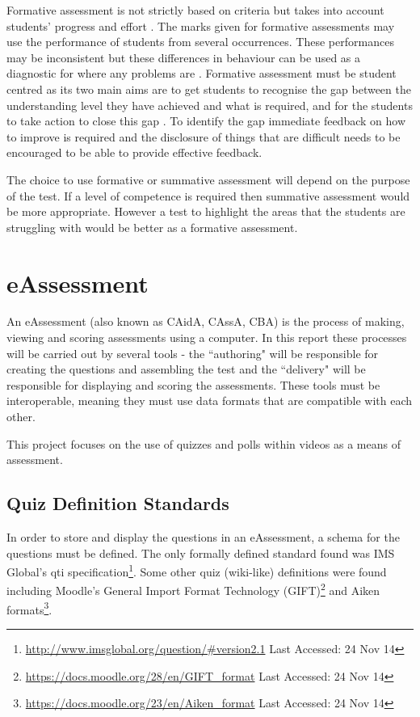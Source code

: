 Formative assessment is not strictly based on criteria but takes into account students' progress and effort \citep{assessmentTypes}. The marks given for formative assessments may use the performance of students from several occurrences. These performances may be inconsistent but these differences in behaviour can be used as a diagnostic for where any problems are \citep{assessmentTypes}. Formative assessment must be student centred as its two main aims are to get students to recognise the gap between the understanding level they have achieved and what is required, and for the students to take action to close this gap \citep{usesOfAssessment}. To identify the gap immediate feedback on how to improve is required \citep{eps265979} and the disclosure of things that are difficult needs to be encouraged \citep{knight2001briefing} to be able to provide effective feedback.

The choice to use formative or summative assessment will depend on the purpose of the test. If a level of competence is required then summative assessment would be more appropriate. However a test to highlight the areas that the students are struggling with would be better as a formative assessment.

\section{eAssessment}
An \gls{eAssessment} (also known as \gls{CAidA}, \gls{CAssA}, \gls{CBA}) is the process of making, viewing and scoring assessments using a computer. In this report these processes will be carried out by several tools - the ``\gls{authoring}" will be responsible for creating the questions and assembling the test and the ``\gls{delivery}" will be responsible for displaying and scoring the assessments. These tools must be interoperable, meaning they must use data formats that are compatible with each other.

This project focuses on the use of quizzes and polls within videos as a means of assessment.

\subsection{Quiz Definition Standards}
\label{Subsection:Quiz Definition Standards}
In order to store and display the questions in an \gls{eAssessment}, a schema for the questions must be defined. The only formally defined standard found was IMS Global's \gls{qti} specification\footnote{\url{http://www.imsglobal.org/question/\#version2.1} Last Accessed: 24 Nov 14}. Some other quiz (wiki-like) definitions were found including Moodle's General Import Format Technology (GIFT)\footnote{\url{https://docs.moodle.org/28/en/GIFT_format} Last Accessed: 24 Nov 14} and Aiken formats\footnote{\url{https://docs.moodle.org/23/en/Aiken_format} Last Accessed: 24 Nov 14}.

